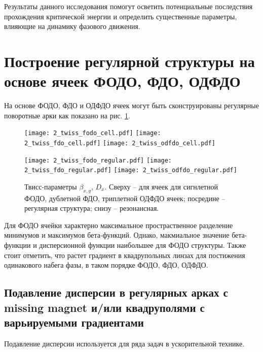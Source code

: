 \par Результаты данного исследования помогут осветить потенциальные последствия прохождения критической энергии и определить существенные параметры, влияющие на динамику фазового движения.

	\section{Построение регулярной структуры на основе ячеек ФОДО, ФДО, ОДФДО}\label{sec:transition_jump/FODO_FDO}

\par На основе ФОДО, ФДО и ОДФДО ячеек могут быть сконструированы регулярные поворотные арки как показано на рис. \ref{fig:fodo_fdo_odfdo_regular}.

\begin{figure} [h!]

   \texttt{[image: 2\_twiss\_fodo\_cell.pdf]}
   \texttt{[image: 2\_twiss\_fdo\_cell.pdf]}
   \texttt{[image: 2\_twiss\_odfdo\_cell.pdf]}

   \texttt{[image: 2\_twiss\_fodo\_regular.pdf]}
   \texttt{[image: 2\_twiss\_fdo\_regular.pdf]}
   \texttt{[image: 2\_twiss\_odfdo\_regular.pdf]}

   \caption{Твисс-параметры $\beta_{x,y}$, $D_{x}$. Сверху -- для ячеек для сигнлетной ФОДО, дублетной ФДО, триплетной ОДФДО ячеек; посредине -- регулярная структура; снизу -- резонансная.}
   \label{fig:fodo_fdo_odfdo_regular}
\end{figure}

\par Для ФОДО ячейки характерно максимальное простраственное разделение минимумов и максимумов бета-функций. Однако, макмиальное значение бета-функции и дисперсионной функции наибольшее для ФОДО структуры. Также стоит отметить, что растет градиент в квадрупольных линзах для постижения одинакового набега фазы, в таком порядке ФОДО, ФДО, ОДФДО. 

	\subsection{Подавление дисперсии в регулярных арках с missing magnet и/или квадруполями с варьируемыми градиентами}\label{sec:transition_jump/suppression}

\par Подавление дисперсии используется для ряда задач в ускорительной технике.
	
